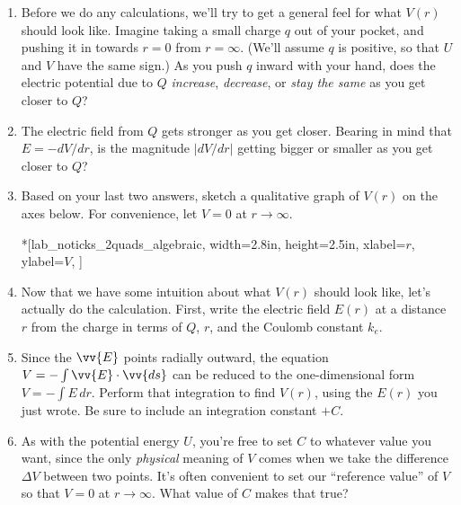 \begin{enumerate}[labparts]

\item Before we do any calculations, we'll try to get a general feel for what $V(r)$ should look like.  Imagine taking a small charge $q$ out of your pocket, and pushing it in towards $r=0$ from $r=\infty$.  (We'll assume $q$ is positive, so that $U$ and $V$ have the same sign.)  As you push $q$ inward with your hand, does the electric potential due to $Q$ \textit{increase}, \textit{decrease}, or \textit{stay the same} as you get closer to $Q$?
\answerspace{0.4in}

\item The electric field from $Q$ gets stronger as you get closer.  Bearing in mind that $E = -dV/dr$, is the magnitude $\left | {dV}/{dr}\right |$ getting bigger or smaller as you get closer to $Q$?
\answerspace{0.4in}

\item Based on your last two answers, sketch a qualitative graph of $V(r)$ on the axes below.  For convenience, let $V=0$ at $r \rightarrow \infty$. \label{part_potential_intro_sketch_of_Vr}
\begin{lab_axis}*[lab_noticks_2quads_algebraic,
	width={2.8in}, height={2.5in},
	xlabel={$r$},
	ylabel={$V$},
	]
\end{lab_axis}

\pagebreak[2]
\item Now that we have some intuition about what $V(r)$ should look like, let's actually do the calculation.  First, write the electric field $E(r)$ at a distance $r$ from the charge in terms of $Q$, $r$, and the Coulomb constant $k_e$.
\answerspace{0.5in}

\item Since the $\vv{E}$ points radially outward, the equation $V=-\int{\vv{E} \cdot \vv{ds}}$ can be reduced to 
the one-dimensional form $V=-\int{E \, dr}$.  Perform that integration to find $V(r)$, using the $E(r)$ you just wrote. Be sure to include an integration constant $+C$.
\answerspace{1.2in}

\item As with the potential energy $U$, you're free to set $C$ to whatever value you want, since the only \textit{physical} meaning of $V$ comes when we take the difference $\Delta V$ between two points.  It's often convenient to set our ``reference value'' of $V$ so that $V=0$ at $r \rightarrow \infty$.  What value of $C$ makes that true?
\answerspace{0.5in}


\end{enumerate}
